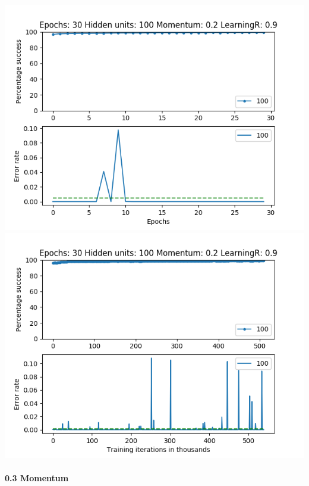 \documentclass[11pt]{article}
\makeatletter
\def\maxwidth{\ifdim\Gin@nat@width>\linewidth\linewidth
    \else\Gin@nat@width\fi}
\let\Oldincludegraphics\includegraphics
\renewcommand{\includegraphics}[1]{\Oldincludegraphics[width=.8\maxwidth]{#1}}
\makeatother
\begin{document}
\includegraphics{Experiment1/E1_NN_Epoch_Momentum_0.2_30Epochs_100_LR_0.9_Hiddenunits.png}
\includegraphics{Experiment1/E1_NN_Training_Momentum_0.2_30Epochs_100_LR_0.9_Hiddenunits.png}

\hypertarget{momentum-3}{%
\paragraph{0.3 Momentum}\label{momentum-3}}
\end{document}
